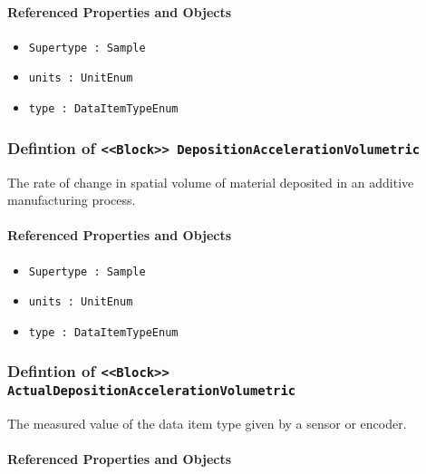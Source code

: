 \FloatBarrier
\paragraph{Referenced Properties and Objects}

\begin{itemize}
\item \texttt{Supertype : Sample}

\item \texttt{units : UnitEnum}

\item \texttt{type : DataItemTypeEnum}

\end{itemize}
\FloatBarrier
\subsubsection{Defintion of \texttt{<<Block>> DepositionAccelerationVolumetric}}
  \label{type:DepositionAccelerationVolumetric}

\FloatBarrier

The rate of change in spatial volume of material deposited in an additive manufacturing process.

\FloatBarrier
\paragraph{Referenced Properties and Objects}

\begin{itemize}
\item \texttt{Supertype : Sample}

\item \texttt{units : UnitEnum}

\item \texttt{type : DataItemTypeEnum}

\end{itemize}
\FloatBarrier
\subsubsection{Defintion of \texttt{<<Block>> ActualDepositionAccelerationVolumetric}}
  \label{type:ActualDepositionAccelerationVolumetric}

\FloatBarrier

The measured value of the data item type given by a sensor or encoder.

\FloatBarrier
\paragraph{Referenced Properties and Objects}

